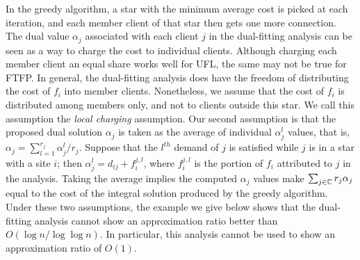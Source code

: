\documentclass[oneside,final]{ucr}
\begin{document}
In the greedy algorithm, a star with the minimum average
cost is picked at each iteration, and each member client of
that star then gets one more connection. The dual value
$\alpha_j$ associated with each client $j$ in the
dual-fitting analysis can be seen as a way to charge the
cost to individual clients. Although charging each member
client an equal share works well for UFL, the same may not
be true for FTFP. In general, the dual-fitting analysis does
have the freedom of distributing the cost of $f_i$ into
member clients. Nonetheless, we assume that the cost of
$f_i$ is distributed among members only, and not to clients
outside this star. We call this assumption the \emph{local
  charging} assumption. Our second assumption is that the
proposed dual solution $\alpha_j$ is taken as the average of
individual $\alpha_j^l$ values, that is, $\alpha_j =
\sum_{l=1}^{r_j} \alpha_j^l / r_j$. Suppose that the
$l^{th}$ demand of $j$ is satisfied while $j$ is in a star
with a site $i$; then $\alpha_j^l = d_{ij} + f_i^{j,l}$,
where $f_i^{j,l}$ is the portion of $f_i$ attributed to $j$
in the analysis. Taking the average implies the computed
$\alpha_j$ values make $\sum_{j\in\mathbb{C}} r_j \alpha_j$
equal to the cost of the integral solution produced by the
greedy algorithm. Under these two assumptions, the example
we give below shows that the dual-fitting analysis cannot
show an approximation ratio better than $O(\log n / \log
\log n)$. In particular, this analysis cannot be used to
show an approximation ratio of $O(1)$.
\end{document}
